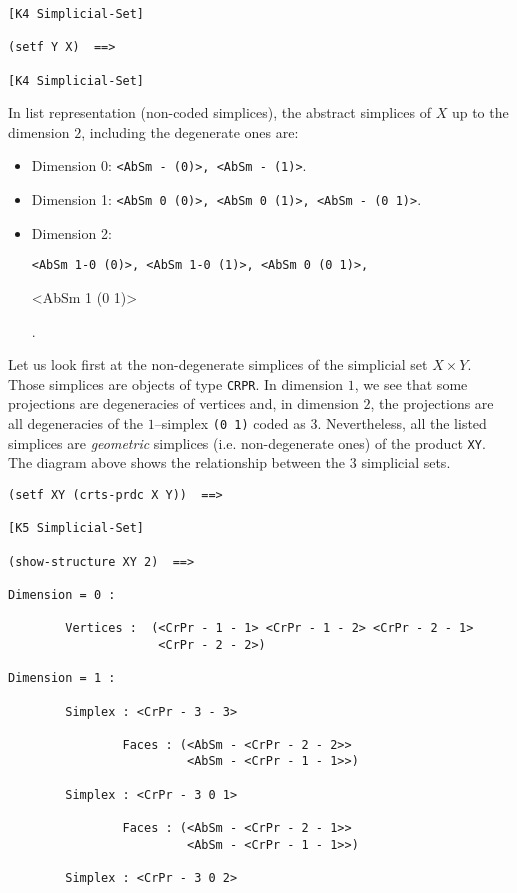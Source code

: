 {{\begin{verbatim}
[K4 Simplicial-Set]

(setf Y X)  ==>

[K4 Simplicial-Set]
\end{verbatim}}
%
\vskip 0.40cm
\centerline{}
\vskip 0.40cm
%

In list representation (non-coded simplices), the  abstract simplices of $X$ up to the dimension $2$, 
including the degenerate ones are:
\begin{itemize}
\item {Dimension 0}: {\footnotesize {\tt <AbSm - (0)>, <AbSm - (1)>}}. 
\item {Dimension 1}: {\footnotesize {\tt <AbSm 0 (0)>,  <AbSm 0 (1)>,  <AbSm - (0 1)>}}. 
\item {Dimension 2}: {\footnotesize {\tt <AbSm 1-0 (0)>, <AbSm 1-0 (1)>,  <AbSm 0 (0 1)>, \par
 <AbSm 1 (0 1)>}}.
\end{itemize}

Let us look first at the non-degenerate simplices of the simplicial set $X \times Y$. Those simplices are objects
of type  {\tt CRPR}. In dimension $1$, we see that some projections are
degeneracies of vertices and, in dimension $2$, the projections are all degeneracies of
the $1$--simplex {\tt(0 1)} coded as $3$. Nevertheless, all the listed simplices are {\em geometric} 
simplices (i.e. non-degenerate ones) of the product {\tt XY}. The diagram above shows the relationship between
the $3$ simplicial sets. 
{\footnotesize\begin{verbatim}
(setf XY (crts-prdc X Y))  ==>

[K5 Simplicial-Set]

(show-structure XY 2)  ==>

Dimension = 0 :

        Vertices :  (<CrPr - 1 - 1> <CrPr - 1 - 2> <CrPr - 2 - 1>
                     <CrPr - 2 - 2>)

Dimension = 1 :

        Simplex : <CrPr - 3 - 3>

                Faces : (<AbSm - <CrPr - 2 - 2>>
                         <AbSm - <CrPr - 1 - 1>>)

        Simplex : <CrPr - 3 0 1>

                Faces : (<AbSm - <CrPr - 2 - 1>>
                         <AbSm - <CrPr - 1 - 1>>)

        Simplex : <CrPr - 3 0 2>


\end{verbatim}}}
